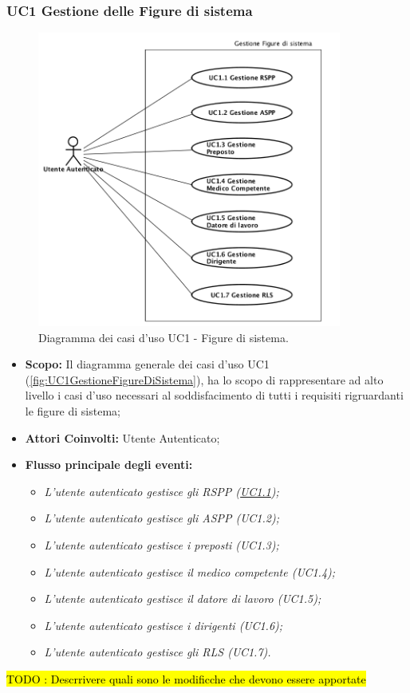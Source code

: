 	\subsubsection{UC1 Gestione delle Figure di sistema}
	\label{section:UC1}
	\begin{figure}[H]
		\begin{center}
			\includegraphics[width=10cm]{Pics/UC1GestioneFigureDiSistema.png}
			\caption{
				Diagramma dei casi d'uso UC1 - Figure di sistema.}
			\label{fig:UC1GestioneFigureDiSistema}
		\end{center}
	\end{figure}
	\begin{itemize}
		\item \textbf{Scopo:} Il diagramma generale dei casi d'uso UC1 (\autoref{fig:UC1GestioneFigureDiSistema}), ha lo scopo di rappresentare ad alto livello i casi d'uso necessari al soddisfacimento di tutti i requisiti rigruardanti le figure di sistema;
		\item \textbf{Attori Coinvolti:} Utente Autenticato;
		\item \textbf{Flusso principale degli eventi:} 
		\begin{itemize}
			\item \textit{L'utente autenticato gestisce gli RSPP (\hyperref[section:UC1_1]{UC1.1});}
			\item \textit{L'utente autenticato gestisce gli ASPP (UC1.2);}
			\item \textit{L'utente autenticato gestisce i preposti (UC1.3);}
			\item \textit{L'utente autenticato gestisce il medico competente (UC1.4);}
			\item \textit{L'utente autenticato gestisce il datore di lavoro (UC1.5);}
			\item \textit{L'utente autenticato gestisce i dirigenti (UC1.6);}
			\item \textit{L'utente autenticato gestisce gli RLS (UC1.7).}
		\end{itemize}
	\end{itemize}
	\hl{TODO : Descrrivere quali sono le modificche che devono essere apportate}
		
